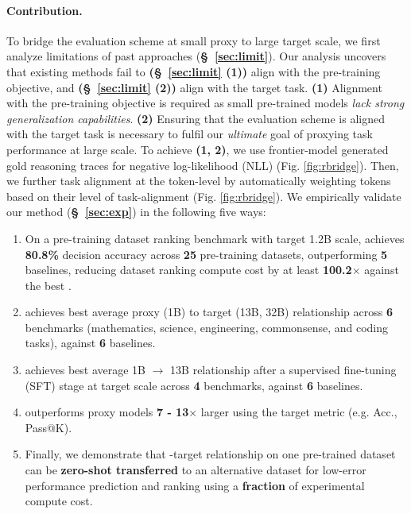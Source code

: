 
 
\paragraph{Contribution.} To bridge the evaluation scheme at small proxy to large target scale, we first analyze limitations of past approaches (\textbf{\S\ \ref{sec:limit}}). Our analysis uncovers that existing methods fail to \textbf{(\S\ \ref{sec:limit} (1))} align with the pre-training objective, and \textbf{(\S\ \ref{sec:limit} (2))} align with the target task. \textbf{(1)} Alignment with the pre-training objective is required as small pre-trained models \textit{lack strong generalization capabilities}. \textbf{(2)} Ensuring that the evaluation scheme is aligned with the target task is necessary to fulfil our \textit{ultimate} goal of proxying task performance at large scale. To achieve \textbf{(1, 2)}, we use frontier-model generated gold reasoning traces \citep{NEURIPS2022_9d560961} for negative log-likelihood (NLL) (Fig. \ref{fig:rbridge}). Then, we further task alignment at the token-level by automatically weighting tokens based on their level of task-alignment (Fig. \ref{fig:rbridge}). We empirically validate our method  (\textbf{\S\ \ref{sec:exp}}) in the following five ways:
\begin{enumerate}
    \item On a pre-training dataset ranking benchmark with target 1.2B scale,  achieves \textbf{80.8\%} decision accuracy across \textbf{25} pre-training datasets, outperforming \textbf{5} baselines, reducing dataset ranking compute cost by at least \textbf{100.2$\times$} against the best .
    \item {} achieves best average proxy (1B) to target (13B, 32B) relationship across \textbf{6} benchmarks (mathematics, science, engineering, commonsense, and coding tasks), against \textbf{6} baselines. 
    \item {} achieves best average 1B $\rightarrow$ 13B relationship after a supervised fine-tuning (SFT) stage at target scale across \textbf{4} benchmarks, against \textbf{6} baselines.
    \item {} outperforms proxy models \textbf{7 - 13$\times$} larger using the target metric (e.g. Acc., Pass@K).
    \item Finally, we demonstrate that -target relationship on one pre-trained dataset can be \textbf{zero-shot transferred} to an alternative dataset for low-error performance prediction and ranking using a \textbf{fraction} of experimental compute cost.
\end{enumerate}


